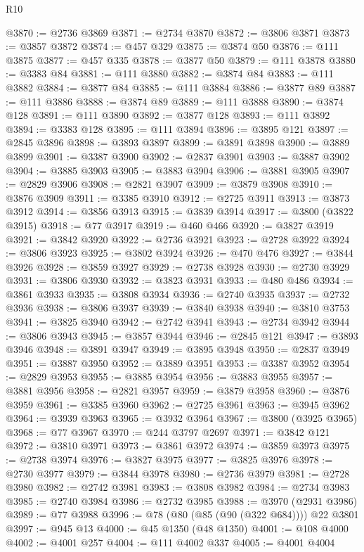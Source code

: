 \begin{lexlean}{R10}
\begin{coremodule}
@3870 := @2736 @3869
@3871 := @2734 @3870
@3872 := @3806 @3871
@3873 := @3857 @3872
@3874 := @457 @329
@3875 := @3874 @50
@3876 := @111 @3875
@3877 := @457 @335
@3878 := @3877 @50
@3879 := @111 @3878
@3880 := @3383 @84
@3881 := @111 @3880
@3882 := @3874 @84
@3883 := @111 @3882
@3884 := @3877 @84
@3885 := @111 @3884
@3886 := @3877 @89
@3887 := @111 @3886
@3888 := @3874 @89
@3889 := @111 @3888
@3890 := @3874 @128
@3891 := @111 @3890
@3892 := @3877 @128
@3893 := @111 @3892
@3894 := @3383 @128
@3895 := @111 @3894
@3896 := @3895 @121
@3897 := @2845 @3896
@3898 := @3893 @3897
@3899 := @3891 @3898
@3900 := @3889 @3899
@3901 := @3387 @3900
@3902 := @2837 @3901
@3903 := @3887 @3902
@3904 := @3885 @3903
@3905 := @3883 @3904
@3906 := @3881 @3905
@3907 := @2829 @3906
@3908 := @2821 @3907
@3909 := @3879 @3908
@3910 := @3876 @3909
@3911 := @3385 @3910
@3912 := @2725 @3911
@3913 := @3873 @3912
@3914 := @3856 @3913
@3915 := @3839 @3914
@3917 := @3800 (@3822 @3915)
@3918 := @77 @3917
@3919 := @460 @466
@3920 := @3827 @3919
@3921 := @3842 @3920
@3922 := @2736 @3921
@3923 := @2728 @3922
@3924 := @3806 @3923
@3925 := @3802 @3924
@3926 := @470 @476
@3927 := @3844 @3926
@3928 := @3859 @3927
@3929 := @2738 @3928
@3930 := @2730 @3929
@3931 := @3806 @3930
@3932 := @3823 @3931
@3933 := @480 @486
@3934 := @3861 @3933
@3935 := @3808 @3934
@3936 := @2740 @3935
@3937 := @2732 @3936
@3938 := @3806 @3937
@3939 := @3840 @3938
@3940 := @3810 @3753
@3941 := @3825 @3940
@3942 := @2742 @3941
@3943 := @2734 @3942
@3944 := @3806 @3943
@3945 := @3857 @3944
@3946 := @2845 @121
@3947 := @3893 @3946
@3948 := @3891 @3947
@3949 := @3895 @3948
@3950 := @2837 @3949
@3951 := @3887 @3950
@3952 := @3889 @3951
@3953 := @3387 @3952
@3954 := @2829 @3953
@3955 := @3885 @3954
@3956 := @3883 @3955
@3957 := @3881 @3956
@3958 := @2821 @3957
@3959 := @3879 @3958
@3960 := @3876 @3959
@3961 := @3385 @3960
@3962 := @2725 @3961
@3963 := @3945 @3962
@3964 := @3939 @3963
@3965 := @3932 @3964
@3967 := @3800 (@3925 @3965)
@3968 := @77 @3967
@3970 := @244 @3797 @2697
@3971 := @3842 @121
@3972 := @3810 @3971
@3973 := @3861 @3972
@3974 := @3859 @3973
@3975 := @2738 @3974
@3976 := @3827 @3975
@3977 := @3825 @3976
@3978 := @2730 @3977
@3979 := @3844 @3978
@3980 := @2736 @3979
@3981 := @2728 @3980
@3982 := @2742 @3981
@3983 := @3808 @3982
@3984 := @2734 @3983
@3985 := @2740 @3984
@3986 := @2732 @3985
@3988 := @3970 (@2931 @3986)
@3989 := @77 @3988
@3996 := @78 (@80 (@85 (@90 (@322 @684)))) @22 @3801
@3997 := @945 @13
@4000 := @45 @1350 (@48 @1350)
@4001 := @108 @4000
@4002 := @4001 @257
@4004 := @111 @4002 @337
@4005 := @4001 @4004

\end{coremodule}
\end{lexlean}
